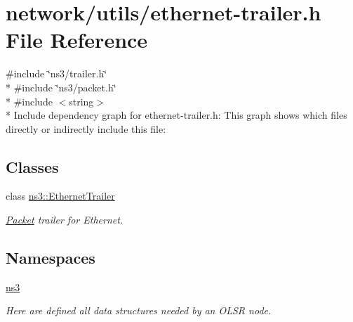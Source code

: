 \hypertarget{ethernet-trailer_8h}{}\section{network/utils/ethernet-\/trailer.h File Reference}
\label{ethernet-trailer_8h}
{\ttfamily \#include \char`\"{}ns3/trailer.\+h\char`\"{}}\\*
{\ttfamily \#include \char`\"{}ns3/packet.\+h\char`\"{}}\\*
{\ttfamily \#include $<$string$>$}\\*
Include dependency graph for ethernet-\/trailer.h\+:
This graph shows which files directly or indirectly include this file\+:
\subsection*{Classes}
\begin{DoxyCompactItemize}
\item 
class \hyperlink{classns3_1_1EthernetTrailer}{ns3\+::\+Ethernet\+Trailer}
\begin{DoxyCompactList}\small\item\em \hyperlink{classns3_1_1Packet}{Packet} trailer for Ethernet. \end{DoxyCompactList}\end{DoxyCompactItemize}
\subsection*{Namespaces}
\begin{DoxyCompactItemize}
\item 
 \hyperlink{namespacens3}{ns3}
\begin{DoxyCompactList}\small\item\em Here are defined all data structures needed by an O\+L\+SR node. \end{DoxyCompactList}\end{DoxyCompactItemize}
